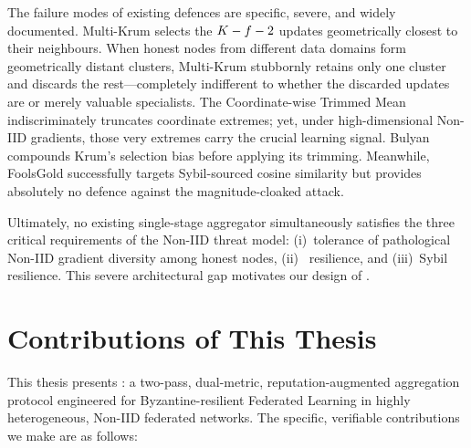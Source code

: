 \documentclass[../main.tex]{subfiles}
\begin{document}
The failure modes of existing defences are specific, severe, and widely documented. Multi-Krum \citep{blanchard2017machine} selects the $K - f - 2$ updates geometrically closest to their neighbours. When honest nodes from different data domains form geometrically distant clusters, Multi-Krum stubbornly retains only one cluster and discards the rest---completely indifferent to whether the discarded updates are \byz{} or merely valuable specialists. The Coordinate-wise Trimmed Mean \citep{yin2018byzantine} indiscriminately truncates coordinate extremes; yet, under high-dimensional Non-IID gradients, those very extremes carry the crucial learning signal. Bulyan \citep{mhamdi2018hidden} compounds Krum's selection bias before applying its trimming. Meanwhile, FoolsGold \citep{fung2020limitations} successfully targets Sybil-sourced cosine similarity but provides absolutely no defence against the magnitude-cloaked \ipm{} attack.

Ultimately, no existing single-stage aggregator simultaneously satisfies the three critical requirements of the Non-IID \byz{} threat model: (i)~tolerance of pathological Non-IID gradient diversity among honest nodes, (ii)~\ipm{} resilience, and (iii)~Sybil resilience. This severe architectural gap motivates our design of \aegis{}.

\section{Contributions of This Thesis}
\label{sec:intro_contributions}

This thesis presents \textbf{\aegis{}}: a two-pass, dual-metric, reputation-augmented aggregation protocol engineered for Byzantine-resilient Federated Learning in highly heterogeneous, Non-IID federated networks. The specific, verifiable contributions we make are as follows:
\end{document}
